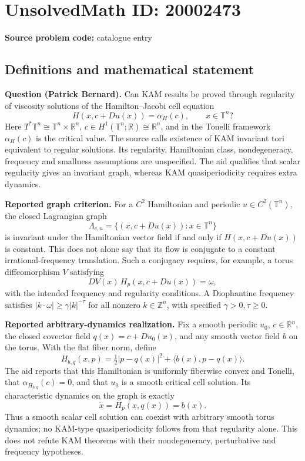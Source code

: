 \documentclass[11pt]{article}
\newcommand{\Z}{\mathbb{Z}}
\newcommand{\R}{\mathbb{R}}
\begin{document}
\section*{UnsolvedMath ID: 20002473}
\textbf{Source problem code:} catalogue entry
\subsection{Definitions and mathematical statement}
\textbf{Question (Patrick Bernard).} Can KAM results be proved through regularity of viscosity solutions of the Hamilton--Jacobi cell equation
\[
 H(x,c+Du(x))=\alpha_H(c),\qquad x\in\mathbb T^n?
\]
Here \(T^*\mathbb T^n\cong\mathbb T^n\times\R^n\), \(c\in H^1(\mathbb T^n;\R)\cong\R^n\), and in the Tonelli framework \(\alpha_H(c)\) is the critical value. The source calls existence of KAM invariant tori equivalent to regular solutions. Its regularity, Hamiltonian class, nondegeneracy, frequency and smallness assumptions are unspecified. The aid qualifies that scalar regularity gives an invariant graph, whereas KAM quasiperiodicity requires extra dynamics.

\textbf{Reported graph criterion.} For a \(C^2\) Hamiltonian and periodic \(u\in C^2(\mathbb T^n)\), the closed Lagrangian graph
\[
 \Lambda_{c,u}=\{(x,c+Du(x)):x\in\mathbb T^n\}
\]
is invariant under the Hamiltonian vector field if and only if \(H(x,c+Du(x))\) is constant. This does not alone say that its flow is conjugate to a constant irrational-frequency translation. Such a conjugacy requires, for example, a torus diffeomorphism \(V\) satisfying
\[
 DV(x)\,H_p(x,c+Du(x))=\omega,
\]
with the intended frequency and regularity conditions. A Diophantine frequency satisfies \(|k\cdot\omega|\geq\gamma|k|^{-\tau}\) for all nonzero \(k\in\Z^n\), with specified \(\gamma>0,\tau\geq0\).

\textbf{Reported arbitrary-dynamics realization.} Fix a smooth periodic \(u_0\), \(c\in\R^n\), the closed covector field \(q(x)=c+Du_0(x)\), and any smooth vector field \(b\) on the torus. With the flat fiber norm, define
\[
 H_{b,q}(x,p)=\tfrac12|p-q(x)|^2+
 \langle b(x),p-q(x)\rangle.
\]
The aid reports that this Hamiltonian is uniformly fiberwise convex and Tonelli, that \(\alpha_{H_{b,q}}(c)=0\), and that \(u_0\) is a smooth critical cell solution. Its characteristic dynamics on the graph is exactly
\[
 \dot x=H_p(x,q(x))=b(x).
\]
Thus a smooth scalar cell solution can coexist with arbitrary smooth torus dynamics; no KAM-type quasiperiodicity follows from that regularity alone. This does not refute KAM theorems with their nondegeneracy, perturbative and frequency hypotheses.
\end{document}
